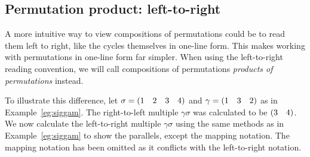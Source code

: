 
\subsection{Permutation product: left-to-right}

A more intuitive way to view compositions of permutations could be to read them left to right, like the cycles themselves in one-line form. This makes working with permutations in one-line form far simpler. When using the left-to-right reading convention, we will call compositions of permutations \textit{products of permutations} instead.

\begin{example}\label{eg:siggam2}
    To illustrate this difference, let $\sigma = (1 \quad 2 \quad 3 \quad 4)$ and $\gamma = (1 \quad 3 \quad 2)$ as in Example~\ref{eg:siggam}. The right-to-left multiple $\gamma\sigma$ was calculated to be $(3 \quad 4)$. We now calculate the left-to-right multiple $\gamma\sigma$ using the same methods as in Example~\ref{eg:siggam} to show the parallels, except the mapping notation. The mapping notation has been omitted as it conflicts with the left-to-right notation.


\end{example}
